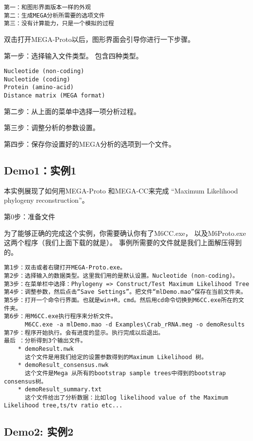 \documentclass[11pt]{ctexart}
\begin{document}
\begin{verbatim}
第一：和图形界面版本一样的外观
第二：生成MEGA分析所需要的选项文件
第三：没有计算能力，只是一个模拟的过程
\end{verbatim}
双击打开MEGA-Proto以后，图形界面会引导你进行一下步骤。

第一步：选择输入文件类型。
包含四种类型。

\begin{verbatim}
Nucleotide (non-coding)
Nucleotide (coding)
Protein (amino-acid)
Distance matrix (MEGA format)
\end{verbatim}

第二步：从上面的菜单中选择一项分析过程。

第三步：调整分析的参数设置。

第四步：保存你设置好的MEGA分析的选项到一个文件。
\subsection{Demo1：实例1}
\label{sec-2-6}

本实例展现了如何用MEGA-Proto 和MEGA-CC来完成
“Maximum Likelihood phylogeny reconstruction”。

第0步：准备文件

为了能够正确的完成这个实例，你需要确认你有了M6CC.exe，
以及M6Proto.exe这两个程序（我们上面下载的就是）。
事例所需要的文件就是我们上面解压得到的。

\begin{verbatim}
第1步：双击或者右键打开MEGA-Proto.exe。
第2步：选择输入的数据类型。这里我们用的是默认设置。Nucleotide (non-coding)。
第3步：在菜单栏中选择：Phylogeny => Construct/Test Maximum Likelihood Tree
第4步：调整参数，然后点击“Save Settings”。把文件“mlDemo.mao”保存在当前文件夹。
第5步：打开一个命令行界面。也就是win+R，cmd。然后用cd命令切换到M6CC.exe所在的文件夹。
第6步：用M6CC.exe执行程序来分析文件。
      M6CC.exe -a mlDemo.mao -d Examples\Crab_rRNA.meg -o demoResults
第7步：程序开始执行。会有进度的显示。执行完成以后退出。
最后 ：分析得到3个输出文件。
    * demoResult.nwk
      这个文件是用我们给定的设置参数得到的Maximum Likelihood 树。
    * demoResult_consensus.nwk
      这个文件是Mega 从所有的bootstrap sample trees中得到的bootstrap consensus树。
    * demoResult_summary.txt
      这个文件给出了分析数据：比如log likelihood value of the Maximum Likelihood tree,ts/tv ratio etc...
\end{verbatim}
\subsection{Demo2: 实例2}
\label{sec-2-7}
\end{document}
